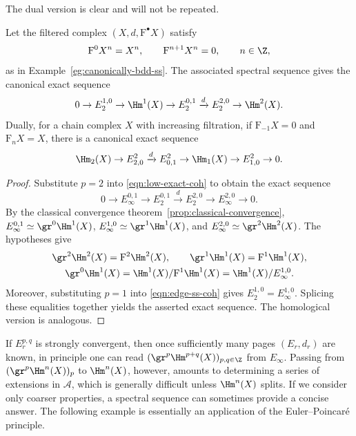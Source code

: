 The dual version is clear and will not be repeated.

\begin{corollary}
\label{prop:low-degree-ss}
	Let the filtered complex $(X,d,\mathrm{F}^\bullet X)$ satisfy
	\[ \mathrm{F}^0X^n=X^n,\qquad \mathrm{F}^{n+1}X^n=0,
	\qquad n\in\Z, \]
	as in Example~\ref{eg:canonically-bdd-ss}. The associated spectral sequence
	gives the canonical exact sequence
	\[ 0\to E_2^{1,0}\to\Hm^1(X)\to E_2^{0,1}\xrightarrow{d}E_2^{2,0}
	\to\Hm^2(X). \]
	Dually, for a chain complex $X$ with increasing filtration, if
	$\mathrm{F}_{-1}X=0$ and $\mathrm{F}_nX=X$, there is a canonical exact
	sequence
	\[ \Hm_2(X)\to E^2_{2,0}\xrightarrow{d}E^2_{0,1}\to\Hm_1(X)
	\to E^2_{1,0}\to0. \]
\end{corollary}
\begin{proof}
	Substitute $p=2$ into \eqref{eqn:low-exact-coh} to obtain the exact sequence
	\[ 0\to E_\infty^{0,1}\to E_2^{0,1}\xrightarrow{d}E_2^{2,0}
	\to E_\infty^{2,0}\to0. \]
	By the classical convergence theorem~\ref{prop:classical-convergence},
	$E_\infty^{0,1}\simeq\gr^0\Hm^1(X)$,
	$E_\infty^{1,0}\simeq\gr^1\Hm^1(X)$, and
	$E_\infty^{2,0}\simeq\gr^2\Hm^2(X)$. The hypotheses give
	\begin{gather*}
		\gr^2\Hm^2(X)=\mathrm{F}^2\Hm^2(X),\qquad
		\gr^1\Hm^1(X)=\mathrm{F}^1\Hm^1(X),\\
		\gr^0\Hm^1(X)=\Hm^1(X)/\mathrm{F}^1\Hm^1(X)
		=\Hm^1(X)/E_\infty^{1,0}.
	\end{gather*}
	Moreover, substituting $p=1$ into \eqref{eqn:edge-ss-coh} gives
	$E_2^{1,0}=E_\infty^{1,0}$. Splicing these equalities together yields the
	asserted exact sequence. The homological version is analogous.
\end{proof}

If $E_r^{p,q}$ is strongly convergent, then once sufficiently many pages
$(E_r,d_r)$ are known, in principle one can read
$(\gr^p\Hm^{p+q}(X))_{p,q\in\Z}$ from $E_\infty$. Passing from
$(\gr^p\Hm^n(X))_p$ to $\Hm^n(X)$, however, amounts to determining a series
of extensions in $\mathcal{A}$, which is generally difficult unless
$\Hm^n(X)$ splits. If we consider only coarser properties, a spectral sequence
can sometimes provide a concise answer. The following example is essentially
an application of the Euler--Poincar\'e principle.

